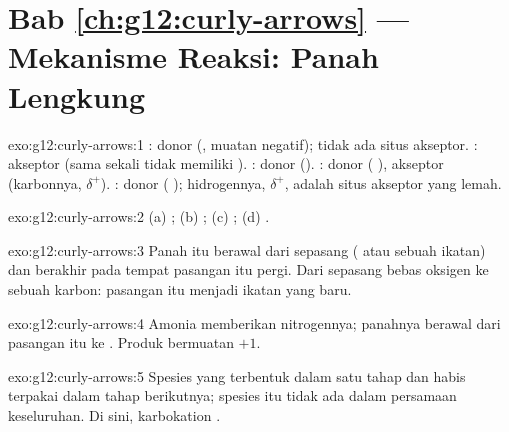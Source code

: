 \section*{Bab \ref{ch:g12:curly-arrows} --- Mekanisme Reaksi: Panah Lengkung}

\begin{solution}{exo:g12:curly-arrows:1}
: donor (, muatan negatif); tidak ada
situs akseptor. : akseptor (sama sekali tidak memiliki ).
: donor (). : donor ( ), akseptor (karbonnya, $\delta^+$). :
donor ( );  hidrogennya,
$\delta^+$, adalah situs akseptor yang lemah.
\end{solution}

\begin{solution}{exo:g12:curly-arrows:2}
(a) ; (b) ; (c) ; (d) .
\end{solution}

\begin{solution}{exo:g12:curly-arrows:3}
Panah itu berawal dari sepasang  ( atau
sebuah ikatan) dan berakhir pada  tempat pasangan itu pergi. Dari
sepasang  bebas oksigen ke sebuah karbon: pasangan itu menjadi
ikatan  yang baru.
\end{solution}

\begin{solution}{exo:g12:curly-arrows:4}
Amonia memberikan   nitrogennya; panahnya
berawal dari pasangan itu ke . Produk  bermuatan $+1$.
\end{solution}

\begin{solution}{exo:g12:curly-arrows:5}
Spesies yang terbentuk dalam satu tahap dan habis terpakai dalam tahap
berikutnya; spesies itu tidak ada dalam persamaan keseluruhan. Di sini,
karbokation .
\end{solution}

